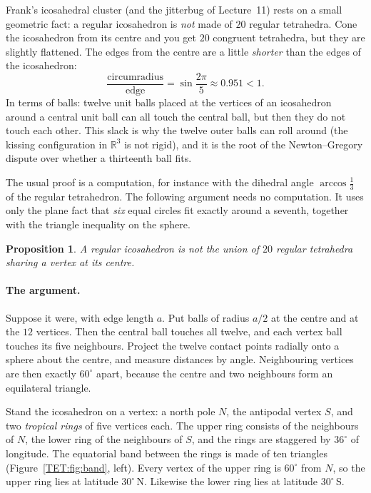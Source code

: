 \documentclass[11pt,openany]{book}
\theoremstyle{plain}
\newtheorem{proposition}[theorem]{Proposition}
\theoremstyle{definition}
\theoremstyle{remark}
\newcommand{\R}{\mathbb{R}}
\begin{document}
Frank's icosahedral cluster (and the jitterbug of Lecture~11) rests on a small geometric fact: a regular
icosahedron is \emph{not} made of $20$ regular tetrahedra. Cone the icosahedron from its centre and
you get $20$ congruent tetrahedra, but they are slightly flattened. The edges from the centre are a
little \emph{shorter} than the edges of the icosahedron:
\[
  \frac{\text{circumradius}}{\text{edge}}=\sin\frac{2\pi}{5}\approx0.951<1 .
\]
In terms of balls: twelve unit balls placed at the vertices of an icosahedron around a central unit
ball can all touch the central ball, but then they do not touch each other. This slack is why the
twelve outer balls can roll around (the kissing configuration in $\R^3$ is not rigid), and it is the
root of the Newton--Gregory dispute over whether a thirteenth ball fits.

The usual proof is a computation, for instance with the dihedral angle $\arccos\frac13$ of the regular
tetrahedron. The following argument needs no computation. It uses only the plane fact that \emph{six}
equal circles fit exactly around a seventh, together with the triangle inequality on the sphere.

\begin{proposition}\label{TET:prop}
A regular icosahedron is not the union of $20$ regular tetrahedra sharing a vertex at its centre.
\end{proposition}

\paragraph{The argument.} Suppose it were, with edge length $a$. Put balls of radius $a/2$ at the centre
and at the $12$ vertices. Then the central ball touches all twelve, and each vertex ball touches its
five neighbours. Project the twelve contact points radially onto a sphere about the centre, and
measure distances by angle. Neighbouring vertices are then exactly $60^\circ$ apart, because the centre
and two neighbours form an equilateral triangle.

Stand the icosahedron on a vertex: a north pole $N$, the antipodal vertex $S$, and two
\emph{tropical rings} of five vertices each. The upper ring consists of the neighbours of $N$, the
lower ring of the neighbours of $S$, and the rings are staggered by $36^\circ$ of longitude. The equatorial
band between the rings is made of ten triangles (Figure~\ref{TET:fig:band}, left). Every vertex of the
upper ring is $60^\circ$ from $N$, so the upper ring lies at latitude $30^\circ$\,N. Likewise the lower ring
lies at latitude $30^\circ$\,S.
\end{document}

